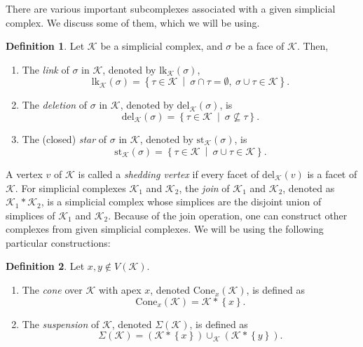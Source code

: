 \documentclass[11pt,reqno,a4paper]{amsart}
\theoremstyle{definition}
\newtheorem{definition}{Definition}[section]
\theoremstyle{theorem}
\newcommand{\lno}{\left(}
\newcommand{\rno}{\right)}
\newcommand{\lcu}{\left\{}
\newcommand{\rcu}{\right\}}
\newcommand{\lk}{\mathrm{lk}}
\newcommand{\del}{\mathrm{del}}
\newcommand{\st}{\mathrm{st}}
\newcommand{\cone}{\mathrm{Cone}}
\theoremstyle{remark}
\begin{document}
There are various important subcomplexes associated with a given simplicial complex. We discuss some of them, which we will be using.
\begin{definition}
    Let $\mathcal{K}$ be a simplicial complex, and $\sigma$ be a face of $\mathcal{K}$. Then,
    \begin{enumerate}[label = \arabic*.]
        \item The \textit{link} of $\sigma$ in $\mathcal{K}$, denoted by $\lk_{\mathcal{K}}\lno \sigma \rno$,
        $$\lk_{\mathcal{K}}\lno \sigma \rno = \lcu \tau \in \mathcal{K}\ \middle|\ \sigma \cap \tau = \emptyset,\ \sigma \cup \tau \in \mathcal{K} \rcu.$$
        
        \item The \textit{deletion} of $\sigma$ in $\mathcal{K}$, denoted by $\del_{\mathcal{K}}\lno \sigma \rno$, is
        $$\del_{\mathcal{K}}\lno \sigma \rno = \lcu \tau \in \mathcal{K}\ \middle|\ \sigma \nsubseteq \tau \rcu.$$
        
        \item The (closed) \textit{star} of $\sigma$ in $\mathcal{K}$, denoted by $\st_{\mathcal{K}}\lno \sigma \rno$, is
        $$\st_{\mathcal{K}}\lno \sigma \rno = \lcu \tau \in \mathcal{K}\ \middle|\ \sigma \cup \tau \in \mathcal{K} \rcu.$$
    \end{enumerate}
\end{definition}

A vertex $v$ of $\mathcal{K}$ is called a \emph{shedding vertex} if every facet of $\del_{\mathcal{K}}\lno v\rno$ is a facet of $\mathcal{K}$.
For simplicial complexes $\mathcal{K}_1$ and $\mathcal{K}_2$, the \textit{join} of $\mathcal{K}_1$ and $\mathcal{K}_2$, denoted as $\mathcal{K}_1 * \mathcal{K}_2$, is a simplicial complex whose simplices are the disjoint union of simplices of $\mathcal{K}_1$ and $\mathcal{K}_2$. Because of the join operation, one can construct other complexes from given simplicial complexes. We will be using the following particular constructions:

\begin{definition}
Let $x, y \notin V\lno \mathcal{K} \rno$.
    \begin{enumerate}
        \item The \textit{cone} over $\mathcal{K}$ with apex $x$, denoted $\cone_{x} \lno \mathcal{K} \rno$, is defined as
        $$\cone_{x} \lno \mathcal{K} \rno = \mathcal{K} * \lcu x \rcu.$$
    
        \item  The \textit{suspension} of $\mathcal{K}$, denoted $\Sigma \lno \mathcal{K} \rno$, is defined as
        $$\Sigma \lno \mathcal{K} \rno = \lno \mathcal{K} * \lcu x \rcu \rno \cup_{\mathcal{K}} \lno \mathcal{K} * \lcu y \rcu \rno .$$
    \end{enumerate}
\end{definition}
\end{document}
